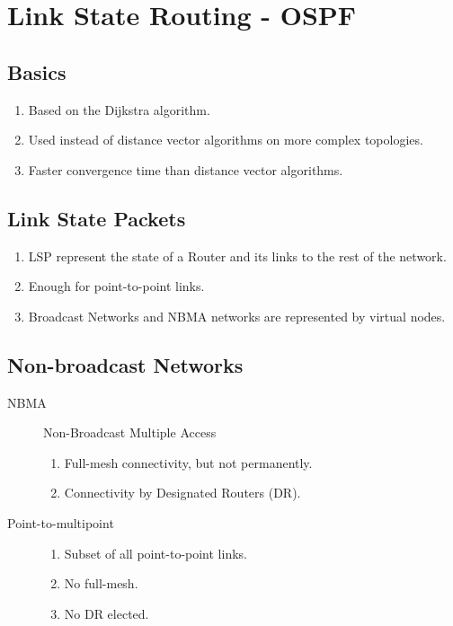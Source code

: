 \documentclass{article}
\begin{document}
\newpage



\section{Link State Routing - OSPF}


\subsection{Basics}


\begin{enumerate}
	\item Based on the Dijkstra algorithm.
	\item Used instead of distance vector algorithms on more complex topologies.
	\item Faster convergence time than distance vector algorithms.
\end{enumerate}


\subsection{Link State Packets}

\begin{enumerate}
	\item LSP represent the state of a Router and its links to the rest of the network.
	\item Enough for point-to-point links.
	\item Broadcast Networks and NBMA networks are represented by virtual nodes.
\end{enumerate}

\subsection{Non-broadcast Networks}

\begin{description}
	\item[NBMA] Non-Broadcast Multiple Access
	\begin{enumerate}
		\item Full-mesh connectivity, but not permanently.
		\item Connectivity by Designated Routers (DR).
	\end{enumerate}
	\item[Point-to-multipoint]
	\begin{enumerate}
		\item Subset of all point-to-point links.
		\item No full-mesh.
		\item No DR elected.
	\end{enumerate}

\end{description}
\end{document}
